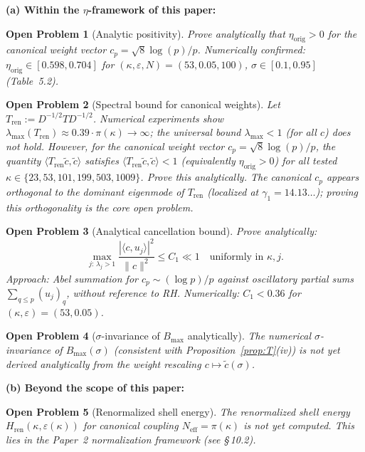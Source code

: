 \documentclass[11pt]{article}
\newtheorem*{openproblem}{Open Problem}
\newcommand{\etaorig}{\eta_{\mathrm{orig}}}
\newcommand{\Tren}{T_{\mathrm{ren}}}
\newcommand{\Hren}{H_{\mathrm{ren}}}
\begin{document}
\textbf{(a) Within the $\eta$-framework of this paper:}

\begin{openproblem}[Analytic positivity]
Prove analytically that $\etaorig>0$ for the canonical weight vector
$c_p=\sqrt{8}\log(p)/p$.
Numerically confirmed: $\etaorig\in[0.598,0.704]$ for $(\kappa,\varepsilon,N)=(53,0.05,100)$,
$\sigma\in[0.1,0.95]$ (Table~5.2).
\end{openproblem}

\begin{openproblem}[Spectral bound for canonical weights]
Let $\Tren:=D^{-1/2}TD^{-1/2}$.
Numerical experiments show $\lambda_{\max}(\Tren)\approx 0.39\cdot\pi(\kappa)\to\infty$;
the universal bound $\lambda_{\max}<1$ (for all $c$) does not hold.
However, for the canonical weight vector $c_p=\sqrt{8}\log(p)/p$,
the quantity $\langle\Tren\tilde{c},\tilde{c}\rangle$ satisfies
$\langle\Tren\tilde{c},\tilde{c}\rangle<1$ (equivalently $\etaorig>0$)
for all tested $\kappa\in\{23,53,101,199,503,1009\}$.
Prove this analytically. The canonical $c_p$ appears orthogonal to the
dominant eigenmode of $\Tren$ (localized at $\gamma_1=14.13\ldots$);
proving this orthogonality is the core open problem.
\end{openproblem}

\begin{openproblem}[Analytical cancellation bound]
Prove analytically:
\[
\max_{j:\,\lambda_j>1}\frac{|\langle c,u_j\rangle|^2}{\|c\|^2}\leq C_1\ll 1
\quad\text{uniformly in }\kappa,j.
\]
Approach: Abel summation for $c_p\sim(\log p)/p$ against oscillatory partial
sums $\sum_{q\leq p}(u_j)_q$, without reference to RH.
Numerically: $C_1<0.36$ for $(\kappa,\varepsilon)=(53,0.05)$.
\end{openproblem}

\begin{openproblem}[$\sigma$-invariance of $B_{\max}$ analytically]
The numerical $\sigma$-invariance of $B_{\max}(\sigma)$ (consistent with
Proposition~\ref{prop:T}(iv)) is not yet derived analytically from the weight
rescaling $c\mapsto\tilde{c}(\sigma)$.
\end{openproblem}

\textbf{(b) Beyond the scope of this paper:}

\begin{openproblem}[Renormalized shell energy]
The renormalized shell energy $\Hren(\kappa,\varepsilon(\kappa))$ for canonical
coupling $N_{\mathrm{eff}}=\pi(\kappa)$ is not yet computed. This lies in the
Paper~2 normalization framework (see \S\,10.2).
\end{openproblem}
\end{document}
